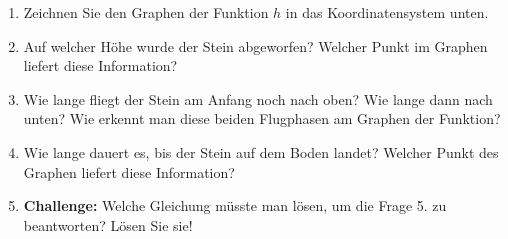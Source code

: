 \begin{LA}
\begin{enumerate}
        \item Zeichnen Sie den Graphen der Funktion \(h\) in das Koordinatensystem unten.

              \begin{center}
              \end{center}

        \item Auf welcher Höhe wurde der Stein abgeworfen?
              Welcher Punkt im Graphen liefert diese Information?

        \item Wie lange fliegt der Stein am Anfang noch nach oben?
              Wie lange dann nach unten? Wie erkennt man diese beiden
              Flugphasen am Graphen der Funktion?

        \item Wie lange dauert es, bis der Stein auf dem Boden
              landet? Welcher Punkt des Graphen liefert diese Information?

        \item \textbf{Challenge:}
              Welche Gleichung müsste man lösen, um die Frage 5.
              zu beantworten? Lösen Sie sie!
    \end{enumerate}
\end{LA}

